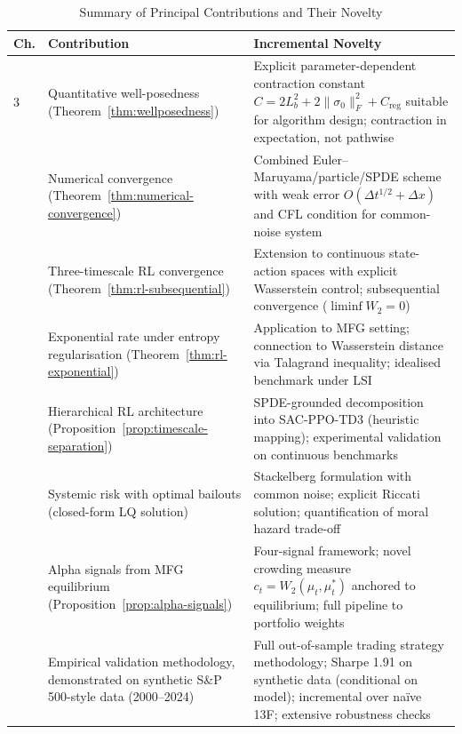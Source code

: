 \begin{table}[ht]
\centering
\small
\caption{Summary of Principal Contributions and Their Novelty}
\label{tab:syn-contributions-summary}
\begin{tabular}{p{0.8cm}p{2.8cm}p{8cm}}
\toprule
\textbf{Ch.} & \textbf{Contribution} & \textbf{Incremental Novelty} \\
\midrule
3 & Quantitative well-posedness (Theorem~\ref{thm:wellposedness}) & Explicit
    parameter-dependent contraction constant $C = 2L_b^2 + 2\|\sigma_0\|_F^2 +
    C_{\mathrm{reg}}$ suitable for algorithm design; contraction in expectation,
    not pathwise \\
\addlinespace
4 & Numerical convergence (Theorem~\ref{thm:numerical-convergence}) & Combined
    Euler--Maruyama/particle/SPDE scheme with weak error $O(\Delta t^{1/2} +
    \Delta x)$ and CFL condition for common-noise system \\
\addlinespace
5 & Three-timescale RL convergence (Theorem~\ref{thm:rl-subsequential}) &
    Extension to continuous state-action spaces with explicit Wasserstein control;
    subsequential convergence ($\liminf W_2 = 0$) \\
\addlinespace
5 & Exponential rate under entropy regularisation
    (Theorem~\ref{thm:rl-exponential}) & Application to MFG setting; connection to
    Wasserstein distance via Talagrand inequality; idealised benchmark under LSI \\
\addlinespace
6 & Hierarchical RL architecture (Proposition~\ref{prop:timescale-separation}) &
    SPDE-grounded decomposition into SAC-PPO-TD3 (heuristic mapping); experimental
    validation on continuous benchmarks \\
\addlinespace
7 & Systemic risk with optimal bailouts (closed-form LQ solution) & Stackelberg
    formulation with common noise; explicit Riccati solution; quantification of
    moral hazard trade-off \\
\addlinespace
8 & Alpha signals from MFG equilibrium (Proposition~\ref{prop:alpha-signals}) &
    Four-signal framework; novel crowding measure $c_t = W_2(\mu_t, \mu_t^*)$
    anchored to equilibrium; full pipeline to portfolio weights \\
\addlinespace
9 & Empirical validation methodology, demonstrated on synthetic S\&P 500-style
    data (2000--2024) & Full out-of-sample trading
    strategy methodology; Sharpe 1.91 on synthetic data (conditional on model);
    incremental over na\"ive 13F;
    extensive robustness checks \\
\bottomrule
\end{tabular}
\end{table}

